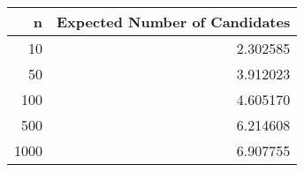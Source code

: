 \begin{table}
\label{tab:exp_candidates}
\begin{tabular}{rr}
\toprule
n & Expected Number of Candidates \\
\midrule
10 & 2.302585 \\
50 & 3.912023 \\
100 & 4.605170 \\
500 & 6.214608 \\
1000 & 6.907755 \\
\bottomrule
\end{tabular}
\end{table}
